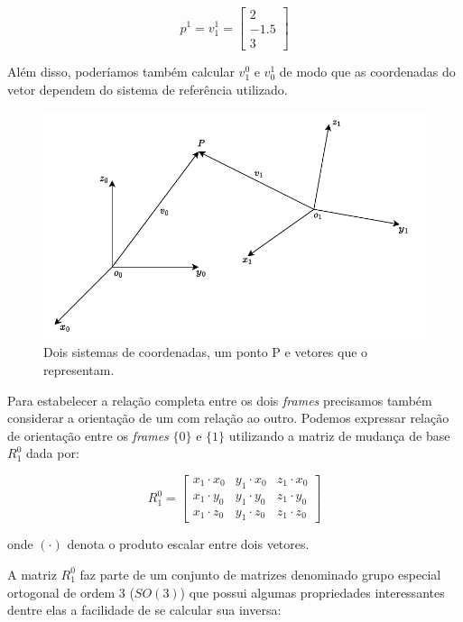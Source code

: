 \begin{equation}
    p^1 = v_1^1 = \begin{bmatrix}
        2    \\
        -1.5 \\
        3
    \end{bmatrix}
\end{equation}

Além disso, poderíamos também calcular \(v_1^0\) e \(v_0^1\) de modo que as
coordenadas do vetor dependem do sistema de referência utilizado.

\begin{figure}
    \centering
    \includegraphics[width=0.8\linewidth]{Images/frames.pdf} %
    \caption{Dois sistemas de coordenadas, um ponto P e vetores que o representam.}\label{fig:frames}
\end{figure}

Para estabelecer a relação completa entre os dois \emph{frames} precisamos
também considerar a orientação de um com relação ao outro. Podemos expressar
relação de orientação entre os \emph{frames} \(\{0\}\) e \(\{1\}\) utilizando a
matriz de mudança de base \(R_1^0\) dada por:

\begin{equation}
    R_1^0 = \begin{bmatrix}
        x_1 \cdot x_0 & y_1 \cdot x_0 & z_1 \cdot x_0 \\
        x_1 \cdot y_0 & y_1 \cdot y_0 & z_1 \cdot y_0 \\
        x_1 \cdot z_0 & y_1 \cdot z_0 & z_1 \cdot z_0
    \end{bmatrix}
\end{equation}

onde \((\cdot)\) denota o produto escalar entre dois vetores.

A matriz \(R_1^0\) faz parte de um conjunto de matrizes denominado grupo
especial ortogonal de ordem 3 (\(SO(3)\)) que possui algumas propriedades
interessantes dentre elas a facilidade de se calcular sua inversa:

